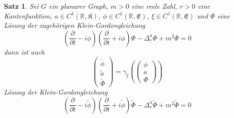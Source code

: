 \documentclass[11pt,a4paper,leqno]{report}
\newtheorem{proposition}{Satz}[chapter]
\numberwithin{equation}{chapter}
\begin{document}
\begin{proposition}
Sei $G$ ein planarer Graph, $m>0$ eine reele Zahl, $r>0$ eine Kantenfunktion, $a\in C^1(\mathbb{R}, \mathfrak{K})$, $\phi\in C^1(\mathbb{R}, \mathfrak{E})$, $\xi\in C^1(\mathbb{R}, \mathfrak{E})$ und $\Phi$ eine L\"osung der zugeh\"origen Klein-Gordongleichung
	\begin{equation}
	(\frac{\partial}{\partial t} - i\phi)(\frac{\partial}{\partial t} + i\phi)\Phi - \Delta^a_r\Phi+ m^2 \Phi = 0
\end{equation}
dann ist auch 
	\begin{equation}
	\left(
	\begin{array}{c}
		\tilde{\phi}\\
		\tilde{a}\\
		\tilde{\Phi}
	\end{array}\right)=
	\gamma_\xi(\left(
\begin{array}{c}\phi\\
	a\\
	\Phi
\end{array}\right))
\end{equation} 
L\"osung der Klein-Gordongleichung
	\begin{equation}
	(\frac{\partial}{\partial t} - i\tilde{\phi})(\frac{\partial}{\partial t} + i\tilde{\phi})\tilde{\Phi} - \Delta^{\tilde{a}}_r\tilde{\Phi}+ m^2 \tilde{\Phi} = 0
	\end{equation}
\end{proposition}
\end{document}
